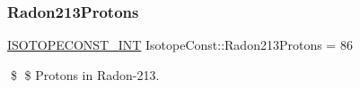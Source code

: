 \subsubsection{\texorpdfstring{Radon213\+Protons}{Radon213Protons}}
{\footnotesize\ttfamily \mbox{\hyperlink{group___isotope_const-_macros_ga5f18360b3e99483a35c32d789e62621c}{I\+S\+O\+T\+O\+P\+E\+C\+O\+N\+S\+T\+\_\+\+I\+NT}} Isotope\+Const\+::\+Radon213\+Protons = 86}

\$ \$ Protons in Radon-\/213. 